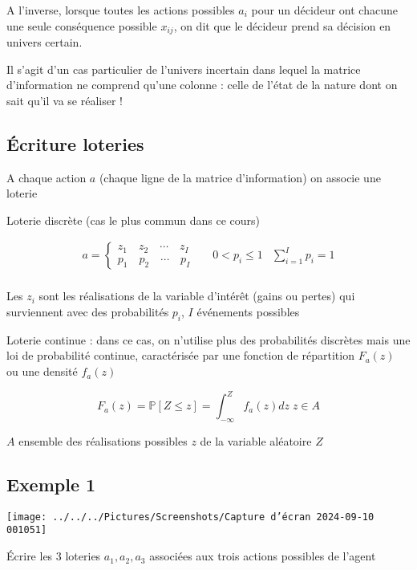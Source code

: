 \documentclass[a4paper, 12pt]{report}
\begin{document}
A l’inverse, lorsque toutes les actions possibles $a_i$ pour un décideur ont chacune une seule conséquence possible $x_{ij}$, on dit que le décideur prend sa décision en univers certain.

Il s’agit d’un cas particulier de l'univers incertain dans lequel la matrice d'information ne comprend qu'une colonne : celle de l'état de la nature dont on sait qu'il va se réaliser !

\subsection{Écriture loteries}

A chaque action $a$ (chaque ligne de la matrice d'information) on associe une loterie

Loterie discrète (cas le plus commun dans ce cours)

$$
\begin{matrix}
	a=\begin{cases}
		z_1 \quad z_2 \quad \cdots \quad z_I & \\
		p_1 \quad p_2 \quad \cdots \quad p_I &
	\end{cases} &  0<p_i \leq 1 & \sum_{i=1}^I p_i=1 \\
\end{matrix}
$$

Les $z_i$ sont les réalisations de la variable d'intérêt (gains ou pertes)
qui surviennent avec des probabilités $p_i$, $I$ événements possibles

Loterie continue : dans ce cas, on n'utilise plus des probabilités discrètes mais une loi de probabilité continue, caractérisée par une fonction de répartition $F_a(z)$ ou une densité $f_a(z)$

$$
F_a(z)=\mathbb{P}\left[ Z\le z \right]=\int_{-\infty }^{Z}f_a(z)dz \; z \in A
$$

$A$ ensemble des réalisations possibles $z$ de la variable aléatoire $Z$

\subsection{Exemple 1}

\begin{center}
	\texttt{[image: ../../../Pictures/Screenshots/Capture d'écran 2024-09-10 001051]}
\end{center}

Écrire les 3 loteries $a_1,a_2,a_3$ associées aux trois actions possibles de l'agent
\end{document}
